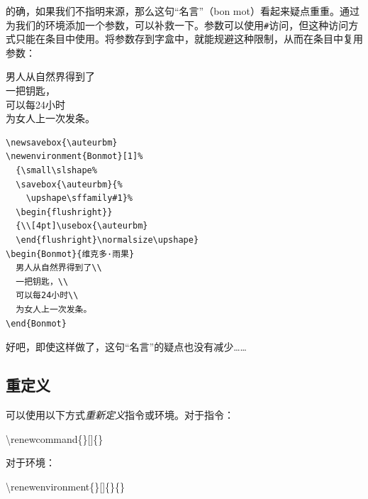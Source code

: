 的确，如果我们不指明来源，那么这句“名言”（bon mot）看起来疑点重重。通过为我们的环境添加一个参数，可以补救一下。参数可以使用\verb|#|访问，但这种访问方式只能在条目中使用。将参数存到字盒中，就能规避这种限制，从而在条目中复用参数：

\begin{codelist}[4.24]{
  \newsavebox{\auteurbm}
\newenvironment{Bonmot}[1]%
  {\small\slshape%
  \savebox{\auteurbm}{%
    \upshape\sffamily#1}%
  \begin{flushright}}
  {\\[4pt]\usebox{\auteurbm}
  \end{flushright}\normalsize\upshape}
\begin{Bonmot}{维克多·雨果}
  男人从自然界得到了\\
  一把钥匙，\\
  可以每24小时\\
  为女人上一次发条。
\end{Bonmot}
}
\begin{verbatim}
\newsavebox{\auteurbm}
\newenvironment{Bonmot}[1]%
  {\small\slshape%
  \savebox{\auteurbm}{%
    \upshape\sffamily#1}%
  \begin{flushright}}
  {\\[4pt]\usebox{\auteurbm}
  \end{flushright}\normalsize\upshape}
\begin{Bonmot}{维克多·雨果}
  男人从自然界得到了\\
  一把钥匙，\\
  可以每24小时\\
  为女人上一次发条。
\end{Bonmot}\end{verbatim}
\end{codelist}

好吧，即使这样做了，这句“名言”的疑点也没有减少……

\subsection{重定义}

可以使用以下方式\emph{重新定义}指令或环境。对于指令：

\begin{dmd}
\backslash renewcommand\{\}[]\{\}
\end{dmd}

对于环境：

\begin{dmd}
\backslash renewenvironment\{\}[]\{\}\{\}
\end{dmd}

